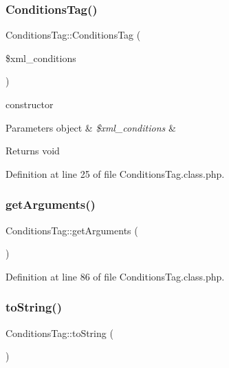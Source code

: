 \subsubsection{\texorpdfstring{Conditions\+Tag()}{ConditionsTag()}}
{\footnotesize\ttfamily Conditions\+Tag\+::\+Conditions\+Tag (\begin{DoxyParamCaption}\item[{}]{\$xml\+\_\+conditions }\end{DoxyParamCaption})}

constructor 
\begin{DoxyParams}[1]{Parameters}
object & {\em \$xml\+\_\+conditions} & \\
\hline
\end{DoxyParams}
\begin{DoxyReturn}{Returns}
void 
\end{DoxyReturn}


Definition at line 25 of file Conditions\+Tag.\+class.\+php.

\mbox{\label{classConditionsTag_a8c7e8f873db4fa6e6c35920bed31afae}} 
\subsubsection{\texorpdfstring{get\+Arguments()}{getArguments()}}
{\footnotesize\ttfamily Conditions\+Tag\+::get\+Arguments (\begin{DoxyParamCaption}{ }\end{DoxyParamCaption})}



Definition at line 86 of file Conditions\+Tag.\+class.\+php.

\mbox{\label{classConditionsTag_af458fe76fa1ffb006306c682e024ee5a}} 
\subsubsection{\texorpdfstring{to\+String()}{toString()}}
{\footnotesize\ttfamily Conditions\+Tag\+::to\+String (\begin{DoxyParamCaption}{ }\end{DoxyParamCaption})}

